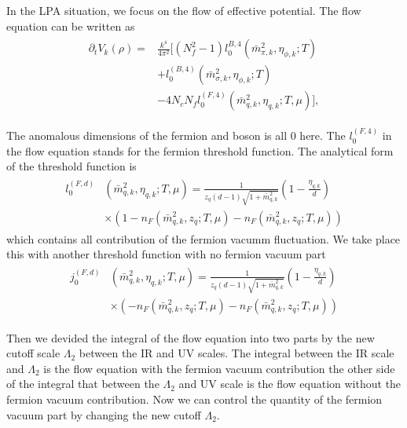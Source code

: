 \documentclass[%
reprint,
superscriptaddress,
showpacs,preprintnumbers,
 amsmath,amssymb,
 aps,
prl,
]{revtex4-1}
\begin{document}
In the LPA situation, we focus on the flow of effective potential. The flow equation can be written as
\begin{align}
\begin{split}
   \partial_t V_k(\rho)=&\frac{k^4}{4\pi^2}\big[(N^2_f-1)l^{B,4}_{0}(\bar{m}^2_{\pi,k},\eta_{\phi,k};T)\\
   &+l^{(B,4)}_{0}(\bar{m}^2_{\sigma,k},\eta_{\phi,k};T)\\
   &-4N_cN_fl^{(F,4)}_{0}(\bar{m}^2_{q,k},\eta_{q,k};T,\mu)\big],
\end{split}
\end{align}
\par The anomalous dimensions of the fermion and boson is all 0 here. The $l^{(F,4)}_{0}$ in the flow equation stands for the fermion threshold function. The analytical form of the threshold function is 
\begin{align}
\begin{split}
l^{(F,d)}_{0}&(\bar{m}^2_{q,k},\eta_{q,k};T,\mu)=\frac{1}{z_q(d-1)\sqrt{1+\bar{m}^2_{q,k}}}(1-\frac{\eta_{q,k}}{d})\\
&\times(1-n_F(\bar{m}^2_{q,k},z_q;T,\mu)-n_F(\bar{m}^2_{q,k},z_q;T,\mu))
\end{split}
\end{align}
which contains all contribution of the fermion vacumm fluctuation. We take place this with another threshold function with no fermion vacuum part 
\begin{align}
\begin{split}
j^{(F,d)}_{0}&(\bar{m}^2_{q,k},\eta_{q,k};T,\mu)=\frac{1}{z_q(d-1)\sqrt{1+\bar{m}^2_{q,k}}}(1-\frac{\eta_{q,k}}{d})\\
&\times(-n_F(\bar{m}^2_{q,k},z_q;T,\mu)-n_F(\bar{m}^2_{q,k},z_q;T,\mu))
\end{split}
\end{align}
\par Then we devided the integral of the flow equation into two parts by the new cutoff scale $\Lambda_2$ between the IR and UV scales. The integral between the IR scale and $\Lambda_2$ is the flow equation with the fermion vacuum contribution the other side of the integral that between the $\Lambda_2$ and UV scale is the flow equation without the fermion vacuum contribution. Now we can control the quantity of the fermion vacuum part by changing the new cutoff $\Lambda_2$.
\end{document}
